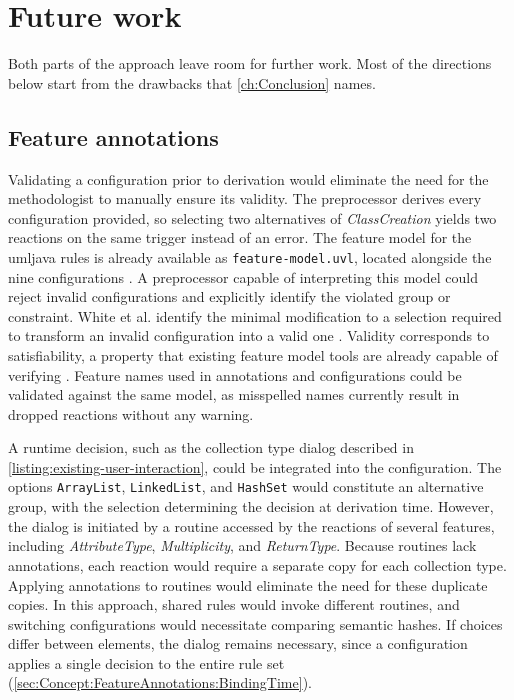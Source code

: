 \chapter{Future work}
\label{ch:FutureWork}

Both parts of the approach leave room for further work.
Most of the directions below start from the drawbacks that \autoref{ch:Conclusion} names.

\section{Feature annotations}
\label{sec:FutureWork:FeatureAnnotations}

Validating a configuration prior to derivation would eliminate the need for the methodologist to manually ensure its validity.
The preprocessor derives every configuration provided, so selecting two alternatives of \textit{ClassCreation} yields two reactions on the same trigger instead of an error.
The feature model for the umljava rules is already available as \texttt{feature-model.uvl}, located alongside the nine configurations \cite{vitruv-dsls-fork}.
A preprocessor capable of interpreting this model could reject invalid configurations and explicitly identify the violated group or constraint.
White et al. identify the minimal modification to a selection required to transform an invalid configuration into a valid one \cite{white2010automated}.
Validity corresponds to satisfiability, a property that existing feature model tools are already capable of verifying \cite{flamapy-ide,kastner2009featureide}.
Feature names used in annotations and configurations could be validated against the same model, as misspelled names currently result in dropped reactions without any warning.

A runtime decision, such as the collection type dialog described in \autoref{listing:existing-user-interaction}, could be integrated into the configuration.
The options \texttt{ArrayList}, \texttt{LinkedList}, and \texttt{HashSet} would constitute an alternative group, with the selection determining the decision at derivation time.
However, the dialog is initiated by a routine accessed by the reactions of several features, including \textit{AttributeType}, \textit{Multiplicity}, and \textit{ReturnType}.
Because routines lack annotations, each reaction would require a separate copy for each collection type.
Applying annotations to routines would eliminate the need for these duplicate copies.
In this approach, shared rules would invoke different routines, and switching configurations would necessitate comparing semantic hashes.
If choices differ between elements, the dialog remains necessary, since a configuration applies a single decision to the entire rule set (\autoref{sec:Concept:FeatureAnnotations:BindingTime}).


